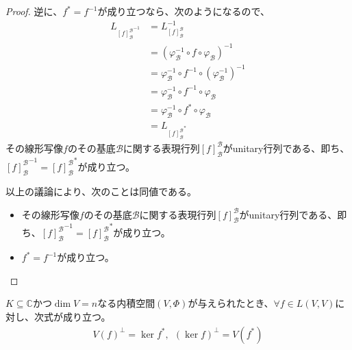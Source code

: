 \documentclass[dvipdfmx]{jsarticle}
\begin{document}
\begin{proof}
逆に、$f^{*} = f^{- 1}$が成り立つなら、次のようになるので、
\begin{align*}
L_{{[ f]_{\mathcal{B}}^{\mathcal{B}}}^{- 1}} &= L_{[ f]_{\mathcal{B}}^{\mathcal{B}}}^{- 1}\\
&= \left( \varphi_{\mathcal{B}}^{- 1} \circ f \circ \varphi_{\mathcal{B}} \right)^{- 1}\\
&= \varphi_{\mathcal{B}}^{- 1} \circ f^{- 1} \circ \left( \varphi_{\mathcal{B}}^{- 1} \right)^{- 1}\\
&= \varphi_{\mathcal{B}}^{- 1} \circ f^{- 1} \circ \varphi_{\mathcal{B}}\\
&= \varphi_{\mathcal{B}}^{- 1} \circ f^{*} \circ \varphi_{\mathcal{B}}\\
&= L_{{[ f]_{\mathcal{B}}^{\mathcal{B}}}^{*}}
\end{align*}
その線形写像$f$のその基底$\mathcal{B}$に関する表現行列$[ f]_{\mathcal{B}}^{\mathcal{B}}$がunitary行列である、即ち、${[ f]_{\mathcal{B}}^{\mathcal{B}}}^{- 1} = {[ f]_{\mathcal{B}}^{\mathcal{B}}}^{*}$が成り立つ。\par
以上の議論により、次のことは同値である。
\begin{itemize}
\item
  その線形写像$f$のその基底$\mathcal{B}$に関する表現行列$[ f]_{\mathcal{B}}^{\mathcal{B}}$がunitary行列である、即ち、${[ f]_{\mathcal{B}}^{\mathcal{B}}}^{- 1} = {[ f]_{\mathcal{B}}^{\mathcal{B}}}^{*}$が成り立つ。
\item
  $f^{*} = f^{- 1}$が成り立つ。
\end{itemize}
\end{proof}
\begin{thm}\label{2.3.8.8}
$K \subseteq \mathbb{C}$かつ$\dim V = n$なる内積空間$(V,\varPhi)$が与えられたとき、$\forall f \in L(V,V)$に対し、次式が成り立つ。
\begin{align*}
{V(f)}^{\bot} = \ker f^{*},\ \ \left( \ker f \right)^{\bot} = V\left( f^{*} \right)
\end{align*}
\end{thm}
\end{document}
